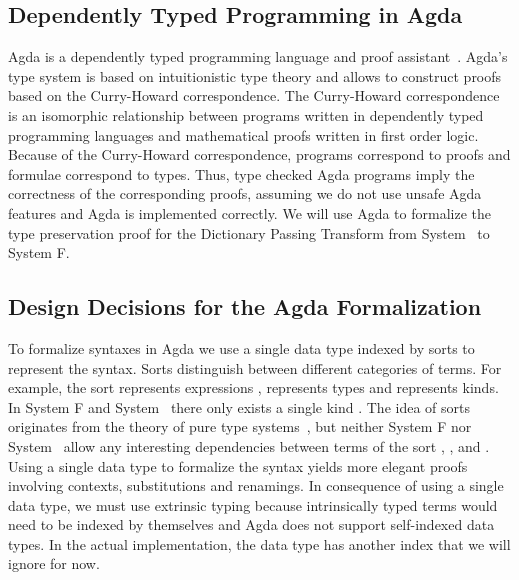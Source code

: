 \subsection{Dependently Typed Programming in Agda}
Agda is a dependently typed programming language and proof assistant~\cite{agda}.
Agda's type system is based on intuitionistic type theory and allows to construct proofs based on the Curry-Howard correspondence. 
The Curry-Howard correspondence is an isomorphic relationship between programs written in dependently typed programming languages and mathematical proofs written in first order logic. 
Because of the Curry-Howard correspondence, programs correspond to proofs and formulae correspond to types. 
Thus, type checked Agda programs imply the correctness of the corresponding proofs, assuming we do not use unsafe Agda features and Agda is implemented correctly. 
We will use Agda to formalize the type preservation proof for the Dictionary Passing Transform from System \Fo\ to System F.

\subsection{Design Decisions for the Agda Formalization}
To formalize syntaxes in Agda we use a single data type  indexed by sorts  to represent the syntax. 
Sorts distinguish between different categories of terms.
For example, the sort  represents expressions ,  represents types  and  represents kinds. In System F and System \Fo\ there only exists a single kind . 
The idea of sorts originates from the theory of pure type systems~\cite{pts}, but neither System F nor System \Fo\ allow any interesting dependencies between terms of the sort , , and .
Using a single data type to formalize the syntax yields more elegant proofs involving contexts, substitutions and renamings. 
In consequence of using a single data type, we must use extrinsic typing because intrinsically typed terms      would need to be indexed by themselves and Agda does not support self-indexed data types. 
In the actual implementation, the data type  has another index  that we will ignore for now.

